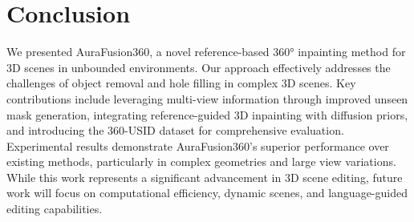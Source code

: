 
\section{Conclusion}
\label{sec:conclusion}

We presented AuraFusion360, a novel reference-based 360° inpainting method for 3D scenes in unbounded environments. Our approach effectively addresses the challenges of object removal and hole filling in complex 3D scenes. Key contributions include leveraging multi-view information through improved unseen mask generation, integrating reference-guided 3D inpainting with diffusion priors, and introducing the 360-USID dataset for comprehensive evaluation.
Experimental results demonstrate AuraFusion360's superior performance over existing methods, particularly in complex geometries and large view variations. While this work represents a significant advancement in 3D scene editing, future work will focus on computational efficiency, dynamic scenes, and language-guided editing capabilities.

